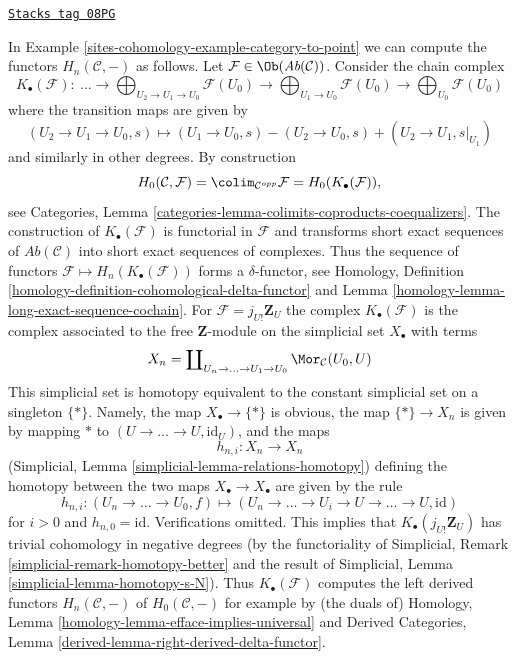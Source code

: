 \begin{example}

\label{sites-cohomology-example-left-derived-colimits}
\href{https://stacks.math.columbia.edu/tag/08PG}{\texttt{Stacks tag 08PG}}

In Example \ref{sites-cohomology-example-category-to-point} we can compute
the functors $H_n(\mathcal{C}, -)$ as follows. Let
$\mathcal{F} \in \Ob(\textit{Ab}(\mathcal{C}))$.
Consider the chain complex
$$
K_\bullet(\mathcal{F}) :
\ \ldots \to
\bigoplus\nolimits_{U_2 \to U_1 \to U_0} \mathcal{F}(U_0)
\to
\bigoplus\nolimits_{U_1 \to U_0} \mathcal{F}(U_0)
\to
\bigoplus\nolimits_{U_0} \mathcal{F}(U_0)
$$
where the transition maps are given by
$$
(U_2 \to U_1 \to U_0, s)
\longmapsto
(U_1 \to U_0, s) - (U_2 \to U_0, s) + (U_2 \to U_1, s|_{U_1})
$$
and similarly in other degrees. By construction
$$
H_0(\mathcal{C}, \mathcal{F}) =
\colim_{\mathcal{C}^{opp}} \mathcal{F} =
H_0(K_\bullet(\mathcal{F})),
$$
see Categories, Lemma \ref{categories-lemma-colimits-coproducts-coequalizers}.
The construction of $K_\bullet(\mathcal{F})$ is functorial in $\mathcal{F}$
and transforms short exact sequences of $\textit{Ab}(\mathcal{C})$ into
short exact sequences of complexes. Thus the sequence of functors
$\mathcal{F} \mapsto H_n(K_\bullet(\mathcal{F}))$ forms a $\delta$-functor, see
Homology, Definition \ref{homology-definition-cohomological-delta-functor} and
Lemma \ref{homology-lemma-long-exact-sequence-cochain}.
For $\mathcal{F} = j_{U!}\mathbf{Z}_U$ the complex $K_\bullet(\mathcal{F})$
is the complex associated to the free $\mathbf{Z}$-module on the simplicial
set $X_\bullet$ with terms
$$
X_n = \coprod\nolimits_{U_n \to \ldots \to U_1 \to U_0}
\Mor_\mathcal{C}(U_0, U)
$$
This simplicial set is homotopy equivalent to the constant simplicial
set on a singleton $\{*\}$. Namely, the map $X_\bullet \to \{*\}$
is obvious, the map $\{*\} \to X_n$ is given
by mapping $*$ to $(U \to \ldots \to U, \text{id}_U)$, and the
maps
$$
h_{n, i} : X_n \longrightarrow X_n
$$
(Simplicial, Lemma \ref{simplicial-lemma-relations-homotopy})
defining the homotopy between the two maps $X_\bullet \to X_\bullet$
are given by the rule
$$
h_{n, i} :
(U_n \to \ldots \to U_0, f)
\longmapsto
(U_n \to \ldots \to U_i \to U \to \ldots \to U, \text{id})
$$
for $i > 0$ and $h_{n, 0} = \text{id}$. Verifications omitted.
This implies that $K_\bullet(j_{U!}\mathbf{Z}_U)$ has trivial
cohomology in negative degrees
(by the functoriality of
Simplicial, Remark \ref{simplicial-remark-homotopy-better}
and the result of
Simplicial, Lemma \ref{simplicial-lemma-homotopy-s-N}).
Thus $K_\bullet(\mathcal{F})$ computes the left derived functors
$H_n(\mathcal{C}, -)$ of $H_0(\mathcal{C}, -)$
for example by (the duals of)
Homology, Lemma \ref{homology-lemma-efface-implies-universal}
and
Derived Categories, Lemma \ref{derived-lemma-right-derived-delta-functor}.
\end{example}

